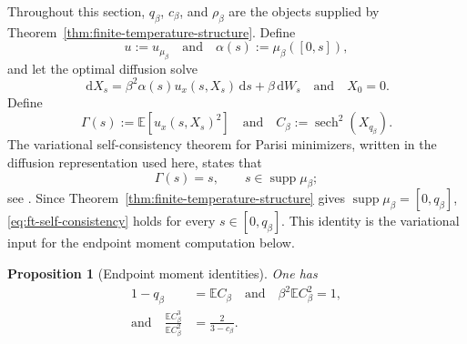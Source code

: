 \documentclass[10pt]{amsart}
\newtheorem{proposition}[proposition]{Proposition}
\theoremstyle{definition}
\theoremstyle{remark}
\numberwithin{equation}{section}
\newcommand{\E}{\mathbb E}
\newcommand{\1}{\mathbf 1}
\newcommand{\supp}{\operatorname{supp}}
\newcommand{\sech}{\operatorname{sech}}
\newcommand{\dd}{\,\mathrm d}
\begin{document}
Throughout this section, $q_\beta$, $c_\beta$, and $\rho_\beta$ are the objects supplied by Theorem~\ref{thm:finite-temperature-structure}. Define
\begin{equation*}
 u:=u_{\mu_\beta}
 \quad\text{and}\quad
 \alpha(s):=\mu_\beta([0,s]),
\end{equation*}
and let the optimal diffusion solve
\begin{equation*}
 \dd X_s=\beta^2\alpha(s)u_x(s,X_s)\dd s+\beta\dd W_s
 \quad\text{and}\quad X_0=0.
\end{equation*}
Define
\begin{equation*}
 \Gamma(s):=\E[u_x(s,X_s)^2]
 \quad\text{and}\quad
 C_\beta:=\sech^2(X_{q_\beta}).
\end{equation*}
The variational self-consistency theorem for Parisi minimizers, written in the diffusion representation used here, states that
\begin{equation}
 \Gamma(s)=s,
 \qquad
 s\in\supp\mu_\beta;
 \label{eq:ft-self-consistency}
\end{equation}
see \cite[Theorem~5]{AuffingerChenProperties}. Since Theorem~\ref{thm:finite-temperature-structure} gives $\supp\mu_\beta=[0,q_\beta]$, \eqref{eq:ft-self-consistency} holds for every $s\in[0,q_\beta]$. This identity is the variational input for the endpoint moment computation below.

\begin{proposition}[Endpoint moment identities]
\label{prop:ft-endpoint-identities}
One has
\begin{align}
 1-q_\beta&=\E C_\beta\quad\text{and}\quad \beta^2\E C_\beta^2=1,
 \label{eq:ft-endpoint-first-two}\\
 \text{and}\quad \frac{\E C_\beta^3}{\E C_\beta^2}
 &=\frac2{3-c_\beta}.
 \label{eq:ft-endpoint-atom-ratio}
\end{align}
\end{proposition}
\end{document}
